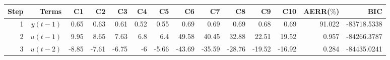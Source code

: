 \begin{tabular}{rrrrrrrrrrrrrr}
Step & Terms & C1 & C2 & C3 & C4 & C5 & C6 & C7 & C8 & C9 & C10 & AERR($\%$) & BIC \\ 
\hline 
1 & $y(t-1)$ & 0.65 & 0.63 & 0.61 & 0.52 & 0.55 & 0.69 & 0.69 & 0.69 & 0.68 & 0.69 & 91.022 & -83718.5338 \\ 
2 & $u(t-1)$ & 9.95 & 8.65 & 7.63 & 6.8 & 6.4 & 49.58 & 40.45 & 32.88 & 22.51 & 19.52 & 0.957 & -84266.3787 \\ 
3 & $u(t-2)$ & -8.85 & -7.61 & -6.75 & -6 & -5.66 & -43.69 & -35.59 & -28.76 & -19.52 & -16.92 & 0.284 & -84435.0241 \\ 
\hline 
\end{tabular}